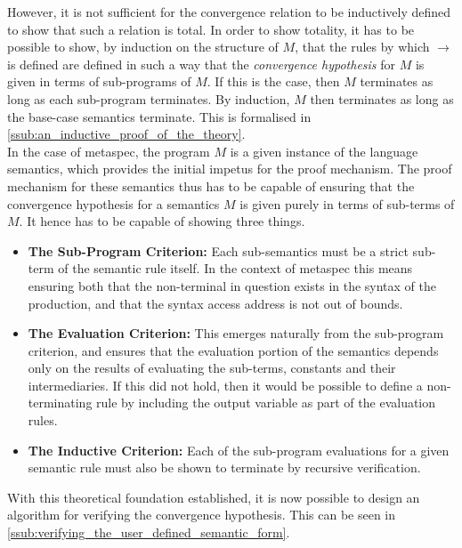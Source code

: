 However, it is not sufficient for the convergence relation to be inductively defined to show that such a relation is total. 
In order to show totality, it has to be possible to show, by induction on the structure of $M$, that the rules by which $\to$ is defined are defined in such a way that the \textit{convergence hypothesis} for $M$ is given in terms of sub-programs of $M$.
If this is the case, then $M$ terminates as long as each sub-program terminates.
By induction, $M$ then terminates as long as the base-case semantics terminate.
This is formalised in \autoref{ssub:an_inductive_proof_of_the_theory}.\\

In the case of \gls{metaspec}, the program $M$ is a given instance of the language semantics, which provides the initial impetus for the proof mechanism. 
The proof mechanism for these semantics thus has to be capable of ensuring that the convergence hypothesis for a semantics $M$ is given purely in terms of sub-terms of $M$. 
It hence has to be capable of showing three things.
\begin{itemize}
    \item \textbf{The Sub-Program Criterion:} Each sub-semantics must be a strict sub-term of the semantic rule itself. 
    In the context of \gls{metaspec} this means ensuring both that the non-terminal in question exists in the syntax of the production, and that the syntax access address is not out of bounds. 
    \item \textbf{The Evaluation Criterion:} This emerges naturally from the sub-program criterion, and ensures that the evaluation portion of the semantics depends only on the results of evaluating the sub-terms, constants and their intermediaries. 
    If this did not hold, then it would be possible to define a non-terminating rule by including the output variable as part of the evaluation rules. 
    \item \textbf{The Inductive Criterion:} Each of the sub-program evaluations for a given semantic rule must also be shown to terminate by recursive verification.
\end{itemize}

With this theoretical foundation established, it is now possible to design an algorithm for verifying the convergence hypothesis.
This can be seen in \autoref{ssub:verifying_the_user_defined_semantic_form}. 

